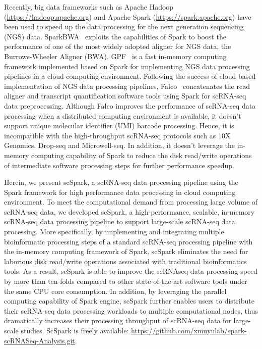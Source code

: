 \documentclass[conference]{IEEEtran}
\begin{document}
Recently, big data frameworks such as Apache Hadoop (\url{https://hadoop.apache.org}) and Apache Spark (\url{https://spark.apache.org}) have been used to speed up the data processing for the next generation sequencing (NGS) data. 
SparkBWA~\cite{Abun2016SparkBWA} exploits the capabilities of Spark to boost the performance of one of the most widely adopted aligner for NGS data, the Burrows-Wheeler Aligner (BWA). 
GPF~\cite{Li2018Highperformance} is a fast in-memory computing framework implemented based on Spark for implementing NGS data processing pipelines in a cloud-computing environment. 
Following the success of cloud-based implementation of NGS data processing pipelines, Falco~\cite{Yang2017Falco} concatenates the read aligner and transcript quantification software tools using Spark for scRNA-seq data preprocessing.
Although Falco improves the performance of scRNA-seq data processing when a distributed computing environment is available, it doesn't support unique molecular identifier (UMI) barcode processing. Hence, it is incompatible with the high-throughput scRNA-seq protocols such as 10X Genomics, Drop-seq and Microwell-seq. In addition, it doesn't leverage the in-memory computing capability of Spark to reduce the disk read/write operations of intermediate software processing steps for further performance speedup.  

Herein, we present scSpark, a scRNA-seq data processing pipeline using the Spark framework for high performance data processing in cloud computing environment. 
To meet the computational demand from processing large volume of scRNA-seq data, 
we developed scSpark, a high-performance, scalable, in-memory scRNA-seq data processing pipeline to support large-scale scRNA-seq data processing. More specifically, 
by implementing and integrating multiple bioinformatic processing steps of a standard scRNA-seq processing pipeline with the in-memory computing framework of Spark, scSpark eliminates the need for laborious disk read/write operations associated with traditional bioinformatics tools.
As a result, scSpark is able to improve the scRNAseq data processing speed by more than ten-folds compared to other state-of-the-art software tools under the same CPU core consumption. In addition, by leveraging the parallel computing capability of Spark engine, scSpark further enables users to distribute their scRNA-seq data processing workloads to multiple computational nodes, thus dramatically increases their processing throughput of scRNA-seq data for large-scale studies. 
ScSpark is freely available: \url{https://github.com/xmuyulab/spark-scRNASeq-Analysis.git}.
\end{document}
